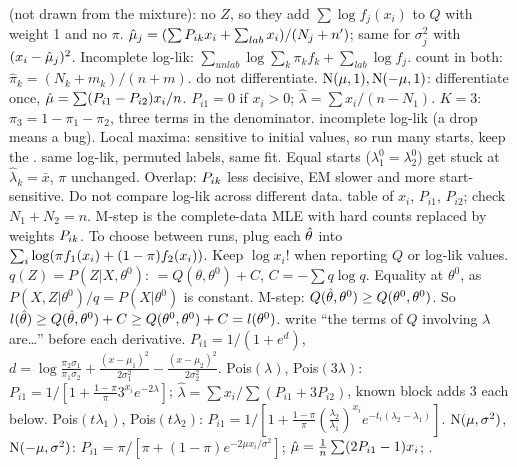 \sk{} (not drawn from the mixture): no $Z$, so they add $\sum\log f_j(x_i)$ to $Q$ with weight 1 and no $\pi$.  $\hat{\mu}_j=(\sum P_{ik} x_i+\sum_{lab}x_i)/(N_j+n')$; same for $\sigma_j^2$ with $(x_i-\hat{\mu}_j)^2$. Incomplete log-lik: $\sum_{unlab}\log\sum_k\pi_kf_k+\sum_{lab}\log f_j$.
\sk{} count in both: $\hat\pi_k=(N_k+m_k)/(n+m)$.  do not differentiate.  $\mathrm{N}(\mu,1),\mathrm{N}(-\mu,1)$: differentiate once, $\hat{\mu}=\sum(P_{i1}-P_{i2})x_i/n$.  $P_{i1}=0$ if $x_i>0$; $\hat\lambda=\sum x_i/(n-N_1)$. $K=3$: $\pi_3=1-\pi_1-\pi_2$, three terms in the denominator.
\sk{} incomplete log-lik  (a drop means a bug). Local maxima: sensitive to initial values, so run many starts, keep the .  same log-lik, permuted labels, same fit. Equal starts ($\lambda_1^0=\lambda_2^0$) get stuck at $\hat\lambda_k=\bar x$, $\pi$ unchanged. Overlap: $P_{ik}$ less decisive, EM slower and more start-sensitive. Do not compare log-lik across different data.
\sk{} table of $x_i$, $P_{i1}$, $P_{i2}$; check $N_1+N_2=n$. M-step is the complete-data MLE with hard counts replaced by weights $P_{ik}$. To choose between runs, plug each $\hat{\theta}$ into $\sum_{i}\log(\pi f_1(x_i)+(1-\pi)f_2(x_i))$. Keep $\log x_i!$ when reporting $Q$ or log-lik values.
\sk{} $q(Z)=P(Z|X,\theta^0)$:
$=Q(\theta,\theta^0)+C$, $C=-\sum q\log q$. Equality at $\theta^0$, as $P(X,Z|\theta^0)/q=P(X|\theta^0)$ is constant. M-step: $Q(\hat{\theta},\theta^0)\ge Q(\theta^0,\theta^0)$. So $l(\hat{\theta})\ge Q(\hat{\theta},\theta^0)+C\ge Q(\theta^0,\theta^0)+C=l(\theta^0)$.
\bx
{} write “the terms of $Q$ involving $\lambda$ are…” before each derivative.
\sk{} $P_{i1}=1/(1+e^{d})$, $d=\log\frac{\pi_2\sigma_1}{\pi_1\sigma_2}+\frac{(x-\mu_1)^2}{2\sigma_1^2}-\frac{(x-\mu_2)^2}{2\sigma_2^2}$.
\li Pois$(\lambda)$, Pois$(3\lambda)$: $P_{i1}=1/[1+\frac{1-\pi}\pi3^{x_i}e^{-2\lambda}]$; $\hat\lambda=\sum x_i/\sum(P_{i1}+3P_{i2})$, known block adds 3 each below.
\li Pois$(t\lambda_1)$, Pois$(t\lambda_2)$: $P_{i1}=1/[1+\frac{1-\pi}\pi(\frac{\lambda_2}{\lambda_1})^{x_i}e^{-t_i(\lambda_2-\lambda_1)}]$.
\li $\mathrm{N}(\mu,\sigma^2)$, $\mathrm{N}(-\mu,\sigma^2)$: $P_{i1}=\pi/[\pi+(1-\pi)e^{-2\mu x_i/\sigma^2}]$; $\hat{\mu}=\frac1n\sum(2P_{i1}-1)x_i$; .
